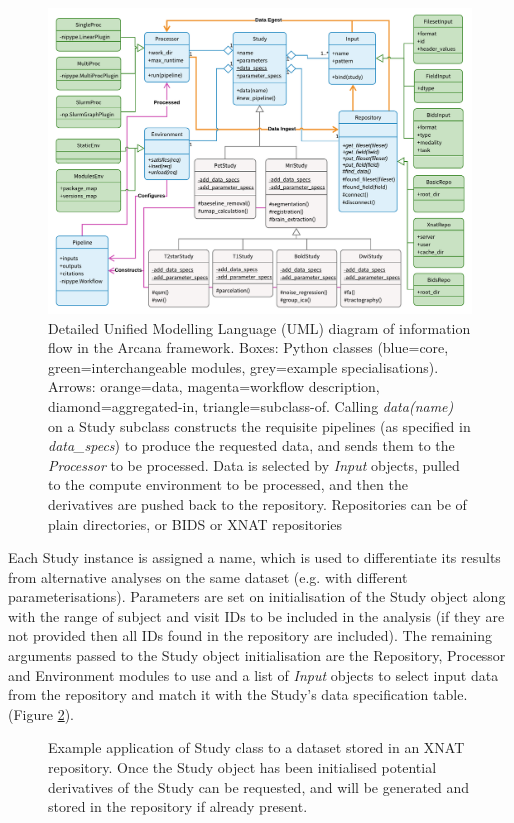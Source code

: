 \documentclass[smallextended]{svjour3}       %
\begin{document}
\begin{figure}
	\centering
    \includegraphics[width=\textwidth]{../figures/full_arcana_uml}
  \caption{Detailed Unified Modelling Language (UML) diagram of
information flow in the Arcana framework. Boxes: Python classes
(blue=core, green=interchangeable modules, grey=example
specialisations). Arrows: orange=data, magenta=workflow description,
diamond=aggregated-in, triangle=subclass-of. Calling \emph{data(name)}
on a Study subclass constructs the requisite pipelines (as specified in
\emph{data\_specs}) to produce the requested data, and sends them
to the \emph{Processor} to be processed. Data is selected by
\emph{Input} objects, pulled to the compute environment to be
processed, and then the derivatives are pushed back to the repository.
Repositories can be of plain directories, or BIDS or XNAT repositories}
\label{fig:full_uml}
\end{figure}

Each Study instance is assigned a name, which is used to differentiate its
results from alternative analyses on the same dataset (e.g. with different
parameterisations). Parameters are set on initialisation of the Study object
along with the range of subject and visit IDs to be included in the analysis
(if they are not provided then all IDs found in the repository are included).
The remaining arguments passed to the Study object initialisation are the
Repository, Processor and Environment modules to use and a list of
\emph{Input} objects to select input data from the repository and match
it with the Study's data specification table.
(Figure \ref{fig:study_application}).

\begin{figure}

\caption{Example application of Study class to a dataset stored in an XNAT
repository. Once the Study object has been initialised potential
derivatives of the Study can be requested, and will be generated and
stored in the repository if already present.}
\label{fig:study_application}
\end{figure}
\end{document}
